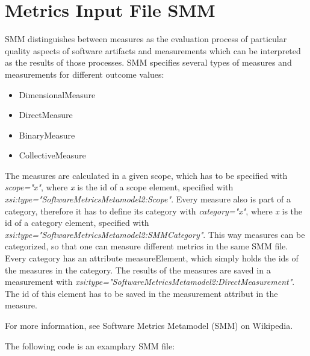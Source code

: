 \section{Metrics Input File SMM}
SMM distinguishes between measures as the evaluation process of particular quality aspects of software artifacts and measurements which can be interpreted as the results of those processes. SMM specifies several types of measures and measurements for different outcome values:
\begin{itemize}
\item DimensionalMeasure
\item DirectMeasure
\item BinaryMeasure
\item CollectiveMeasure
\end{itemize}

The measures are calculated in a given scope, which has to be specified with \textit{scope="x"}, where \textit{x} is the id of a scope element, specified with \textit{xsi:type="SoftwareMetricsMetamodel2:Scope"}. Every measure also is part of a category, therefore it has to define its category with \textit{category="x"}, where \textit{x} is the id of a category element, specified with \textit{xsi:type="SoftwareMetricsMetamodel2:SMMCategory"}. This way measures can be categorized, so that one can measure different metrics in the same SMM file. Every category has an attribute measureElement, which simply holds the ids of the measures in the category. The results of the measures are saved in a measurement with \textit{xsi:type="SoftwareMetricsMetamodel2:DirectMeasurement"}. The id of this element has to be saved in the measurement attribut in the measure.

For more information, see Software Metrics Metamodel (SMM) on Wikipedia.

The following code is an examplary SMM file:

